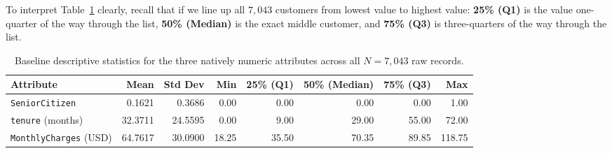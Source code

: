 To interpret Table~\ref{tab:baseline_stats} clearly, recall that if we line up all $7,043$ customers from lowest value to highest value: \textbf{25\% (Q1)} is the value one-quarter of the way through the list, \textbf{50\% (Median)} is the exact middle customer, and \textbf{75\% (Q3)} is three-quarters of the way through the list.

\begin{table}[htbp]
\centering
\small
\begin{tabular}{lrrrrrrr}
\toprule
\textbf{Attribute} & \textbf{Mean} & \textbf{Std Dev} & \textbf{Min} & \textbf{25\% (Q1)} & \textbf{50\% (Median)} & \textbf{75\% (Q3)} & \textbf{Max} \\
\midrule
\texttt{SeniorCitizen}        & 0.1621  & 0.3686  & 0.00   & 0.00   & 0.00   & 0.00   & 1.00 \\
\texttt{tenure} (months)      & 32.3711 & 24.5595 & 0.00   & 9.00   & 29.00  & 55.00  & 72.00 \\
\texttt{MonthlyCharges} (USD) & 64.7617 & 30.0900 & 18.25  & 35.50  & 70.35  & 89.85  & 118.75 \\
\bottomrule
\end{tabular}
\caption{Baseline descriptive statistics for the three natively numeric attributes across all $N = 7,043$ raw records.}
\label{tab:baseline_stats}
\end{table}

